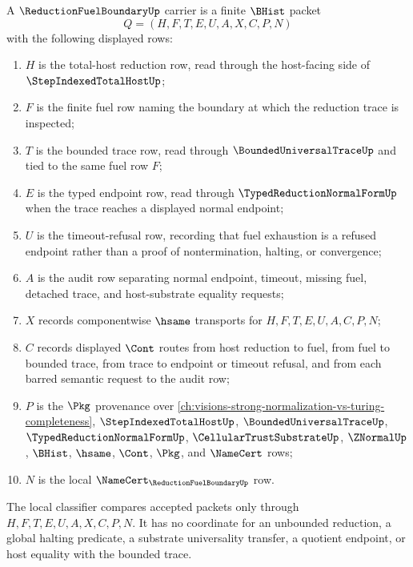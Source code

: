 \begin{definition}
\label{def:reduction-fuel-boundary-carrier}
A $\ReductionFuelBoundaryUp$ carrier is a finite $\BHist$ packet
$$
Q=(H,F,T,E,U,A,X,C,P,N)
$$
with the following displayed rows:
\begin{enumerate}
\item $H$ is the total-host reduction row, read through the host-facing side of $\StepIndexedTotalHostUp$;
\item $F$ is the finite fuel row naming the boundary at which the reduction trace is inspected;
\item $T$ is the bounded trace row, read through $\BoundedUniversalTraceUp$ and tied to the same fuel row $F$;
\item $E$ is the typed endpoint row, read through $\TypedReductionNormalFormUp$ when the trace reaches a displayed normal endpoint;
\item $U$ is the timeout-refusal row, recording that fuel exhaustion is a refused endpoint rather than a proof of nontermination, halting, or convergence;
\item $A$ is the audit row separating normal endpoint, timeout, missing fuel, detached trace, and host-substrate equality requests;
\item $X$ records componentwise $\hsame$ transports for $H,F,T,E,U,A,C,P,N$;
\item $C$ records displayed $\Cont$ routes from host reduction to fuel, from fuel to bounded trace, from trace to endpoint or timeout refusal, and from each barred semantic request to the audit row;
\item $P$ is the $\Pkg$ provenance over \autoref{ch:visions-strong-normalization-vs-turing-completeness}, $\StepIndexedTotalHostUp$, $\BoundedUniversalTraceUp$, $\TypedReductionNormalFormUp$, $\CellularTrustSubstrateUp$, $\ZNormalUp$, $\BHist$, $\hsame$, $\Cont$, $\Pkg$, and $\NameCert$ rows;
\item $N$ is the local $\NameCert_{\ReductionFuelBoundaryUp}$ row.
\end{enumerate}
The local classifier compares accepted packets only through $H,F,T,E,U,A,X,C,P,N$. It has no coordinate for an unbounded reduction, a global halting predicate, a substrate universality transfer, a quotient endpoint, or host equality with the bounded trace.
\end{definition}

